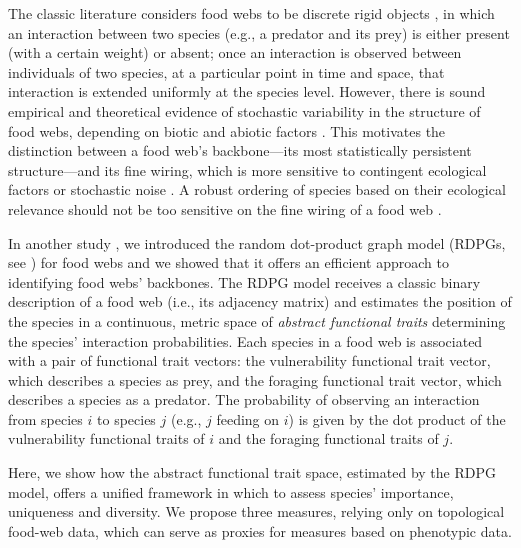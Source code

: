 \documentclass[12pt]{article}
\begin{document}
The classic literature considers food webs to be discrete rigid objects
\citep{coulson2004skeletons}, in which an interaction between two
species (e.g., a predator and its prey) is either present (with a certain
weight) or absent; once an interaction is observed between individuals of two species,
at a particular point in time and space, that interaction is
extended uniformly at the species level. However, there is sound empirical and
theoretical evidence of stochastic variability in the structure of food webs,
depending on biotic and abiotic factors \citep{mullon2009minimal, poisot2015beyond}. This
motivates the distinction between a food web's backbone---its most statistically persistent
structure---and its fine wiring, which is more sensitive to contingent ecological
factors or stochastic noise \citep{grady2012robust, bellingeri2015food}. A robust ordering of species
based on their ecological relevance should not be too sensitive on
the fine wiring of a food web \citep{livi2011identifying}.

In another study \citep{dallariva2015exploring},  we introduced the random dot-product graph
model (RDPGs, see \citet{tang2013universally}) for food webs
and we showed that it offers an efficient approach to identifying food webs'
backbones. The RDPG model receives a classic binary description of a
food web (i.e., its adjacency matrix) and estimates the position of the species in
a continuous, metric space of \emph{abstract functional traits} determining
the species' interaction probabilities.  Each
species in a food web is associated with a pair of functional trait vectors: the
vulnerability functional trait vector, which describes a species as prey, and the
foraging functional trait vector, which describes a species as a predator. The
probability of observing an interaction from species $i$ to species $j$ (e.g.,
$j$ feeding on $i$) is given by the dot product of the vulnerability
functional traits of $i$ and the foraging functional traits of $j$.

Here, we show how the abstract functional trait space, estimated by the RDPG model,
offers a unified framework in which to assess species' importance, uniqueness
and diversity. We propose three measures, relying only on topological food-web data,
which can serve as proxies for measures based on phenotypic data. 
\end{document}
